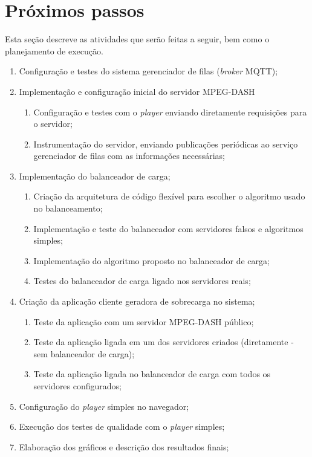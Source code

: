 \section{Próximos passos}

Esta seção descreve as atividades que serão feitas a seguir, bem como o planejamento de execução.

\begin{enumerate}
    \item Configuração e testes do sistema gerenciador de filas (\textit{broker} MQTT);
    \item Implementação e configuração inicial do servidor MPEG-DASH
    \begin{enumerate}
        \item[2.1.] Configuração e testes com o \textit{player} enviando diretamente requisições para o servidor;
        \item[2.2.] Instrumentação do servidor, enviando publicações periódicas ao serviço gerenciador de filas com as informações necessárias;
    \end{enumerate}
    \item Implementação do balanceador de carga;
    \begin{enumerate}
        \item[3.1.] Criação da arquitetura de código flexível para escolher o algoritmo usado no balanceamento;
        \item[3.2.] Implementação e teste do balanceador com servidores falsos e algoritmos simples;
        \item[3.3.] Implementação do algoritmo proposto no balanceador de carga;
        \item[3.4.] Testes do balanceador de carga ligado nos servidores reais;
    \end{enumerate}
    \item Criação da aplicação cliente geradora de sobrecarga no sistema;
    \begin{enumerate}
        \item[4.1.] Teste da aplicação com um servidor MPEG-DASH público;
        \item[4.2.] Teste da aplicação ligada em um dos servidores criados (diretamente - sem balanceador de carga);
        \item[4.3.] Teste da aplicação ligada no balanceador de carga com todos os servidores configurados;
    \end{enumerate}
    \item Configuração do \textit{player} simples no navegador;
    \item Execução dos testes de qualidade com o \textit{player} simples;
    \item Elaboração dos gráficos e descrição dos resultados finais;
\end{enumerate}

